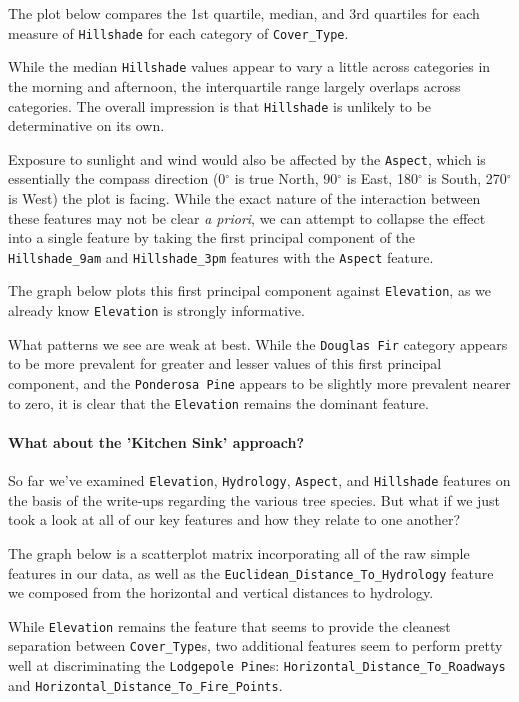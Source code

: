 \documentclass[11pt]{article}
\begin{document}
The plot below compares the 1st quartile, median, and 3rd quartiles for
each measure of \texttt{Hillshade} for each category of
\texttt{Cover\_Type}.

While the median \texttt{Hillshade} values appear to vary a little
across categories in the morning and afternoon, the interquartile range
largely overlaps across categories. The overall impression is that
\texttt{Hillshade} is unlikely to be determinative on its own.

Exposure to sunlight and wind would also be affected by the
\texttt{Aspect}, which is essentially the compass direction (0\(^\circ\)
is true North, 90\(^\circ\) is East, 180\(^\circ\) is South,
270\(^\circ\) is West) the plot is facing. While the exact nature of the
interaction between these features may not be clear \emph{a priori}, we
can attempt to collapse the effect into a single feature by taking the
first principal component of the \texttt{Hillshade\_9am} and
\texttt{Hillshade\_3pm} features with the \texttt{Aspect} feature.

The graph below plots this first principal component against
\texttt{Elevation}, as we already know \texttt{Elevation} is strongly
informative.

    What patterns we see are weak at best. While the \texttt{Douglas\ Fir}
category appears to be more prevalent for greater and lesser values of
this first principal component, and the \texttt{Ponderosa\ Pine} appears
to be slightly more prevalent nearer to zero, it is clear that the
\texttt{Elevation} remains the dominant feature.

    \paragraph{What about the 'Kitchen Sink'
approach?}\label{what-about-the-kitchen-sink-approach}

So far we've examined \texttt{Elevation}, \texttt{Hydrology},
\texttt{Aspect}, and \texttt{Hillshade} features on the basis of the
write-ups regarding the various tree species. But what if we just took a
look at all of our key features and how they relate to one another?

The graph below is a scatterplot matrix incorporating all of the raw
simple features in our data, as well as the
\texttt{Euclidean\_Distance\_To\_Hydrology} feature we composed from the
horizontal and vertical distances to hydrology.

    While \texttt{Elevation} remains the feature that seems to provide the
cleanest separation between \texttt{Cover\_Type}s, two additional
features seem to perform pretty well at discriminating the
\texttt{Lodgepole\ Pine}s: \texttt{Horizontal\_Distance\_To\_Roadways}
and \texttt{Horizontal\_Distance\_To\_Fire\_Points}.
\end{document}
